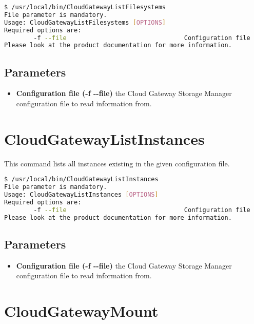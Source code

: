 \documentclass[11pt,fleqn,openany]{book} %
\begin{document}
\begin{lstlisting}[language=bash]
$ /usr/local/bin/CloudGatewayListFilesystems
File parameter is mandatory.
Usage: CloudGatewayListFilesystems [OPTIONS]
Required options are:
        -f --file                                Configuration file
Please look at the product documentation for more information.
\end{lstlisting}

\subsection*{Parameters}

\begin{itemize}
\item \textbf{Configuration file (-f -{}-file)} the Cloud Gateway Storage Manager configuration file to read information from.

\end{itemize}

\clearpage

\section*{CloudGatewayListInstances}
\label{sec:cloudgatewaylistinstances}

This command lists all instances existing in the given configuration file.

\begin{lstlisting}[language=bash]
$ /usr/local/bin/CloudGatewayListInstances
File parameter is mandatory.
Usage: CloudGatewayListInstances [OPTIONS]
Required options are:
        -f --file                                Configuration file
Please look at the product documentation for more information.
\end{lstlisting}

\subsection*{Parameters}

\begin{itemize}
\item \textbf{Configuration file (-f -{}-file)} the Cloud Gateway Storage Manager configuration file to read information from.

\end{itemize}

\clearpage

\section*{CloudGatewayMount}
\label{sec:cloudgatewaymount}
\end{document}
